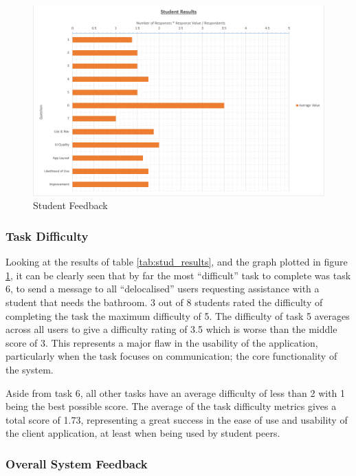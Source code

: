 \begin{figure}[!htbp]
	\centering
	\includegraphics[width=\textwidth]{"evaluation/graphs/student_responses"}
	\caption{Student Feedback}
	\label{fig:student_responses}
\end{figure}

\FloatBarrier

\subsubsection{Task Difficulty}

Looking at the results of table \ref{tab:stud_results}, and the graph plotted in figure \ref{fig:student_responses}, it can be clearly seen that by far the most ``difficult'' task to complete was task 6, to send a message to all ``delocalised'' users requesting assistance with a student that needs the bathroom.  3 out of 8 students rated the difficulty of completing the task the maximum difficulty of 5.  The difficulty of task 5 averages across all users to give a difficulty rating of 3.5 which is worse than the middle score of 3.  This represents a major flaw in the usability of the application, particularly when the task focuses on communication; the core functionality of the system.

Aside from task 6, all other tasks have an average difficulty of less than 2 with 1 being the best possible score.  The average of the task difficulty metrics gives a total score of 1.73, representing a great success in the ease of use and usability of the client application, at least when being used by student peers.

\subsubsection{Overall System Feedback}

